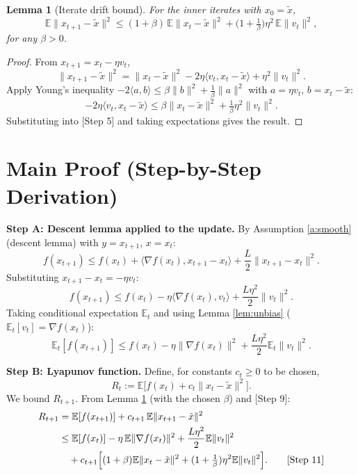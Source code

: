 \documentclass[11pt]{article}
\newtheorem{lemma}{Lemma}
\begin{document}
\begin{lemma}[Iterate drift bound]\label{lem:drift}
For the inner iterates with $x_0=\tilde{x}$,
\[
\mathbb{E}\|x_{t+1}-\tilde{x}\|^2 \le (1+\beta)\,\mathbb{E}\|x_t-\tilde{x}\|^2
+ \Big(1+\tfrac{1}{\beta}\Big)\eta^2\,\mathbb{E}\|v_t\|^2,
\]
for any $\beta>0$.
\end{lemma}
\begin{proof}
From $x_{t+1}=x_t-\eta v_t$,
\[
\|x_{t+1}-\tilde{x}\|^2 = \|x_t-\tilde{x}\|^2 - 2\eta\langle v_t, x_t-\tilde{x}\rangle + \eta^2\|v_t\|^2.
\tag*{[Step 5]}
\]
Apply Young's inequality $-2\langle a,b\rangle \le \beta\|b\|^2 + \tfrac{1}{\beta}\|a\|^2$
with $a=\eta v_t$, $b = x_t-\tilde x$:
\[
-2\eta\langle v_t,x_t-\tilde{x}\rangle \le \beta\|x_t-\tilde{x}\|^2 + \tfrac{1}{\beta}\eta^2\|v_t\|^2.
\tag*{[Step 6]}
\]
Substituting into [Step 5] and taking expectations gives the result.
\end{proof}

\section*{Main Proof (Step-by-Step Derivation)}

\textbf{Step A: Descent lemma applied to the update.}
By Assumption \ref{a:smooth} (descent lemma) with $y=x_{t+1}$, $x=x_t$:
\[
f(x_{t+1}) \le f(x_t) + \langle \nabla f(x_t), x_{t+1}-x_t\rangle + \frac{L}{2}\|x_{t+1}-x_t\|^2.
\tag*{[Step 7]}
\]
Substituting $x_{t+1}-x_t = -\eta v_t$:
\[
f(x_{t+1}) \le f(x_t) - \eta\langle \nabla f(x_t), v_t\rangle + \frac{L\eta^2}{2}\|v_t\|^2.
\tag*{[Step 8]}
\]
Taking conditional expectation $\mathbb{E}_t$ and using Lemma \ref{lem:unbias}
($\mathbb{E}_t[v_t]=\nabla f(x_t)$):
\[
\mathbb{E}_t[f(x_{t+1})] \le f(x_t) - \eta\|\nabla f(x_t)\|^2 + \frac{L\eta^2}{2}\mathbb{E}_t\|v_t\|^2.
\tag*{[Step 9]}
\]

\textbf{Step B: Lyapunov function.}
Define, for constants $c_t \ge 0$ to be chosen,
\[
R_t := \mathbb{E}\big[ f(x_t) + c_t \|x_t - \tilde{x}\|^2 \big].
\tag*{[Step 10]}
\]
We bound $R_{t+1}$. From Lemma \ref{lem:drift} (with the chosen $\beta$) and [Step 9]:
\begin{align}
R_{t+1} &= \mathbb{E}[f(x_{t+1})] + c_{t+1}\,\mathbb{E}\|x_{t+1}-\tilde{x}\|^2 \notag\\
&\le \mathbb{E}[f(x_t)] - \eta\,\mathbb{E}\|\nabla f(x_t)\|^2 + \frac{L\eta^2}{2}\mathbb{E}\|v_t\|^2 \notag\\
&\quad + c_{t+1}\Big[(1+\beta)\mathbb{E}\|x_t-\tilde{x}\|^2 + (1+\tfrac1\beta)\eta^2\mathbb{E}\|v_t\|^2\Big].
\tag*{[Step 11]}
\end{align}
\end{document}
